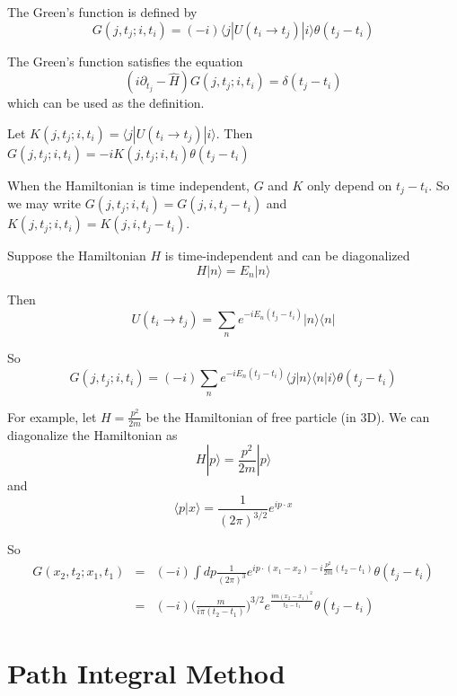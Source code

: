 \documentclass[12pt]{book}
\begin{document}
	The Green's function is defined by
	\begin{equation}
		G(j,t_j;i,t_i)=(-i)\langle j|U(t_i\rightarrow t_j)|i\rangle\theta(t_j-t_i)
	\end{equation}
	
	The Green's function satisfies the equation
	\begin{equation}
		(i\partial_{t_j} -\hat H)G(j,t_j;i,t_i)=\delta(t_j-t_i)
	\end{equation}
	which can be used as the definition.
	
	Let $K(j,t_j;i,t_i)=\langle j|U(t_i\rightarrow t_j)|i\rangle$. Then $G(j,t_j;i,t_i)=-iK(j,t_j;i,t_i)\theta(t_j-t_i)$
	
	When the Hamiltonian is time independent, $G$ and $K$ only depend on $t_j-t_i$. So we may write $G(j,t_j;i,t_i)=G(j,i,t_j-t_i)$ and $K(j,t_j;i,t_i)=K(j,i,t_j-t_i)$.
	
	Suppose the Hamiltonian $H$ is time-independent and can be diagonalized
	\begin{equation}
		H|n\rangle=E_n|n\rangle
	\end{equation}
	
	Then
	\begin{equation}
		U(t_i\rightarrow t_j)=\sum_n e^{-iE_n(t_j-t_i)}|n\rangle\langle n|
	\end{equation}
	
	So
	\begin{equation}
		G(j,t_j;i,t_i)=(-i)\sum_n e^{-iE_n(t_j-t_i)}\langle j|n\rangle\langle n|i\rangle\theta(t_j-t_i)
	\end{equation}
	
	For example, let $H=\frac{p^2}{2m}$ be the Hamiltonian of free particle (in 3D). We can diagonalize the Hamiltonian as
	\begin{equation}
		H|p\rangle=\frac{p^2}{2m}|p\rangle
	\end{equation}
	and 
	\begin{equation}
		\langle p|x\rangle=\frac 1{(2\pi)^{3/2}}e^{ip\cdot x}
	\end{equation}
	
	So
	\begin{eqnarray}
		G(x_2,t_2;x_1,t_1)&=&(-i)\int dp \frac 1{(2\pi)^3}e^{ip\cdot (x_1-x_2)-i\frac{p^2}{2m}(t_2-t_1)}\theta(t_j-t_i)\\
		&=&(-i)\Big(\frac m{i\pi(t_2-t_1)}\Big)^{3/2}e^{\frac{im(x_2-x_1)^2}{t_2-t_1}}\theta(t_j-t_i)
	\end{eqnarray}
		
	\section{Path Integral Method}
	
\end{document}
